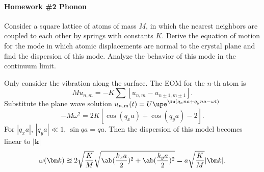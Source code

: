 
\paragraph{Homework \#2 Phonon}

\begin{problem}
  Consider a square lattice of atoms of mass $M$, in which the nearest
  neighbors are coupled to each other by springs with constants $K$.
  Derive the equation of motion for the mode in which atomic displacements are
  normal to the crystal plane and find the dispersion of this mode. Analyze the
  behavior of this mode in the continuum limit.
\end{problem}
\begin{solution}
  Only consider the vibration along the surface. The EOM for the $n$-th atom is
  \[
    M\ddot u_{n,m} = -K \sum [u_{n,m} - u_{n\pm1,m\pm1}].
  \]
  Substitute the plane wave
  solution $u_{n,m}(t) = U\upe^{\iu(q_xna + q_yna - \omega t)}$
  \[
    -M\omega^2 = 2K[\cos(q_xa) + \cos(q_ya) - 2].
  \]
  For $|q_xa|$, $|q_ya| \ll 1$, $\sin qa = qa$.
  Then the dispersion of this model becomes linear to $|\bm k|$
  \[
    \omega(\bm k) \approxeq
    2\sqrt{\frac KM} \sqrt{\ab(\frac{k_xa}2)^2 + \ab(\frac{k_ya}2)^2}
  = a\sqrt{\frac KM} |\bm k|.
  \]
\end{solution}

